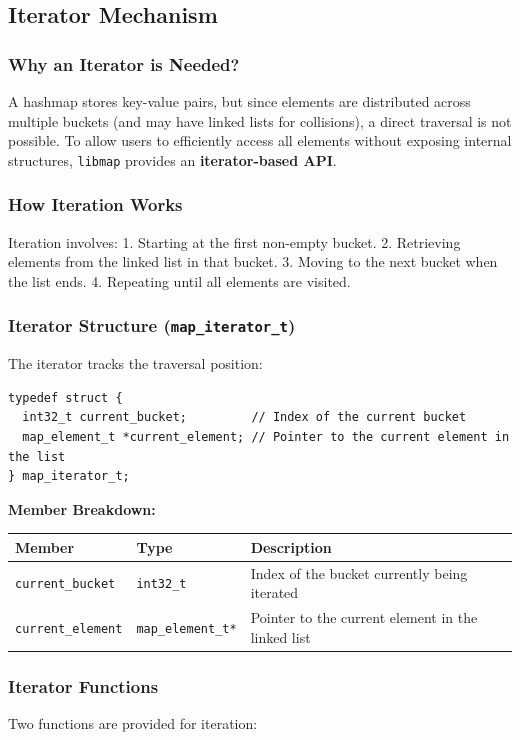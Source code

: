 \documentclass[titlepage]{article}
\begin{document}
\subsection{Iterator Mechanism}

\subsubsection{Why an Iterator is Needed?}
A hashmap stores key-value pairs, but since elements are distributed across multiple buckets (and may have linked lists for collisions), a direct traversal is not possible.
To allow users to efficiently access all elements without exposing internal structures, \texttt{libmap} provides an \textbf{iterator-based API}.

\subsubsection{How Iteration Works}
Iteration involves:
1. Starting at the first non-empty bucket.
2. Retrieving elements from the linked list in that bucket.
3. Moving to the next bucket when the list ends.
4. Repeating until all elements are visited.

\subsubsection{Iterator Structure (\texttt{map\_iterator\_t})}
The iterator tracks the traversal position:
\begin{verbatim}
typedef struct {
  int32_t current_bucket;         // Index of the current bucket
  map_element_t *current_element; // Pointer to the current element in the list
} map_iterator_t;
\end{verbatim}

\textbf{Member Breakdown:}
\begin{center}
\begin{tabular}{@{} l l l @{} }
\toprule
\textbf{Member} & \textbf{Type} & \textbf{Description} \\
\midrule
\texttt{current\_bucket} & \texttt{int32\_t} & Index of the bucket currently being iterated \\
\texttt{current\_element} & \texttt{map\_element\_t*} & Pointer to the current element in the linked list \\
\bottomrule
\end{tabular}
\end{center}

\subsubsection{Iterator Functions}
Two functions are provided for iteration:
\end{document}
